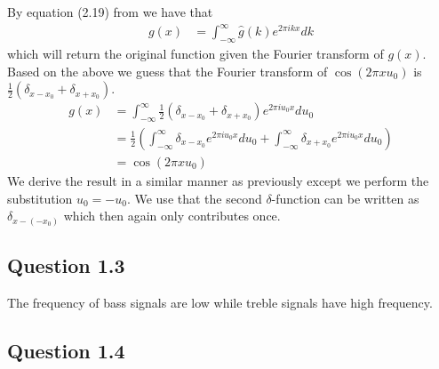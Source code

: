 \documentclass[a4paper, 10pt, final]{article}
\begin{document}
By equation (2.19) from \citeauthor{jahne-digital} we have that
\begin{align*}
    g(x) & = \int_{-\infty}^{\infty}{\hat{g}(k)e^{2\pi ikx}dk}
\end{align*}
which will return the original function given the Fourier transform of
$g(x)$. Based on the above we guess that the Fourier transform of
$\cos(2\pi xu_0)$ is $\frac{1}{2}(\delta_{x - x_0} + \delta_{x + x_0})$.
\begin{align*}
    g(x) & = \int_{-\infty}^{\infty}{\frac{1}{2}(\delta_{x - x_0} +
    \delta_{x + x_0})e^{2\pi iu_0x}du_0}\\
    & = \frac{1}{2}\left( \int_{-\infty}^{\infty}{\delta_{x -
    x_0}e^{2\pi iu_0x}du_0} + \int_{-\infty}^{\infty}{\delta_{x +
    x_0}e^{2\pi iu_0x}du_0}\right)\\
    & = \cos(2\pi xu_0)
\end{align*}
We derive the result in a similar manner as previously except we
perform the substitution $u_0 = - u_0$. We use that the second
$\delta$-function can be written as $\delta_{x - (-x_0)}$ which then
again only contributes once.

\subsection*{Question 1.3}
The frequency of bass signals are low while treble signals have high
frequency.

\subsection*{Question 1.4}






\end{document}
